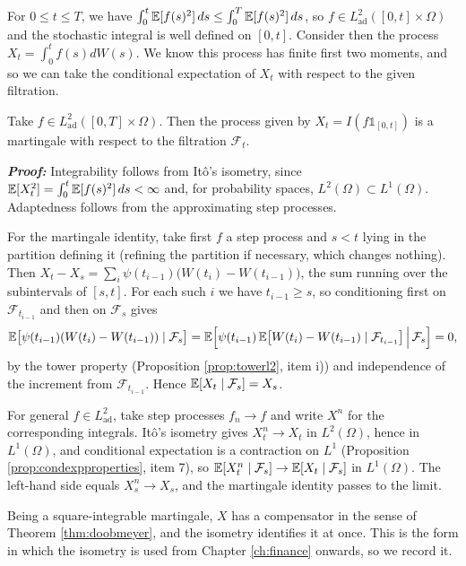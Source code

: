 For $0\leq t \leq T$, we have $\int_0^t \mathbb{E}[f(s)^2]\,ds \leq \int_0^T \mathbb{E}[f(s)^2]\,ds$, so $f\in L^2_{\mathrm{ad}}([0,t]\times \Omega)$ and the stochastic integral is well defined on $[0,t]$. Consider then the process $X_t = \int_0^t f(s) dW(s) .$ We know this process has finite first two moments, and so we can take the conditional expectation of $X_t$ with respect to the given filtration. 

\begin{theorem}[Martingale]\label{theorem:martingale_property}

Take $f\in L^2_{\mathrm{ad}}([0,T]\times\Omega).$ Then the process given by $X_t = I(f \mathds{1}_{[0,t]})$ is a martingale with respect to the filtration $\mathcal{F}_t.$ 
    
\end{theorem}

\textbf{\textit{Proof:}} Integrability follows from Itô's isometry, since
$\mathbb{E}[X_t^2] = \int_0^t \mathbb{E}[f(s)^2]\,ds < \infty$ and, for probability spaces, $L^2(\Omega) \subset L^1(\Omega)$. Adaptedness follows from the approximating step processes.

For the martingale identity, take first $f$ a step process and $s<t$ lying in the partition defining
it (refining the partition if necessary, which changes nothing). Then
$X_t - X_s = \sum_{i} \psi(t_{i-1})\bigl(W(t_i)-W(t_{i-1})\bigr)$, the sum running over the
subintervals of $[s,t]$. For each such $i$ we have $t_{i-1} \geq s$, so conditioning first on
$\mathcal{F}_{t_{i-1}}$ and then on $\mathcal{F}_s$ gives
\[
\mathbb{E}\bigl[\psi(t_{i-1})(W(t_i)-W(t_{i-1})) \mid \mathcal{F}_s\bigr]
= \mathbb{E}\Bigl[\psi(t_{i-1})\,\mathbb{E}\bigl[W(t_i)-W(t_{i-1}) \mid \mathcal{F}_{t_{i-1}}\bigr] \,\Big|\, \mathcal{F}_s\Bigr] = 0,
\]
by the tower property (Proposition \ref{prop:towerl2}, item i)) and independence of the
increment from $\mathcal{F}_{t_{i-1}}$. Hence $\mathbb{E}[X_t \mid \mathcal{F}_s] = X_s$.

For general $f \in L^2_{\mathrm{ad}}$, take step processes $f_n \to f$ and write $X^n$ for the corresponding
integrals. Itô's isometry gives $X^n_t \to X_t$ in $L^2(\Omega)$, hence in $L^1(\Omega)$, and
conditional expectation is a contraction on $L^1$ (Proposition \ref{prop:condexpproperties},
item 7), so $\mathbb{E}[X^n_t \mid \mathcal{F}_s] \to \mathbb{E}[X_t \mid \mathcal{F}_s]$ in
$L^1(\Omega)$. The left-hand side equals $X^n_s \to X_s$, and the martingale identity passes to the
limit. \qedfilledtext

\medskip

Being a square-integrable martingale, $X$ has a compensator in the sense of Theorem
\ref{thm:doobmeyer}, and the isometry identifies it at once. This is the form in which the isometry
is used from Chapter \ref{ch:finance} onwards, so we record it.

